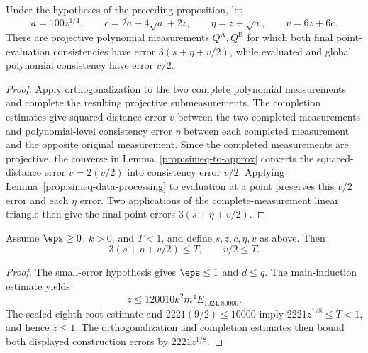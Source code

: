 \begin{proposition}
\label{prop:main-formal-linear-triangle-projective-construction}
	\leanok
	Under the hypotheses of the preceding proposition, let
	\[
		a=100z^{1/4},
		\qquad c=2a+4\sqrt a+2z,
		\qquad \eta=z+\sqrt a,
		\qquad v=6z+6c.
	\]
	There are projective polynomial measurements $Q^{\mathrm A},Q^{\mathrm B}$
	for which both final point-evaluation consistencies have error
	$3(s+\eta+v/2)$, while evaluated and global polynomial consistency have
	error $v/2$.
\end{proposition}
\begin{proof}
	\leanok
	Apply orthogonalization to the two complete polynomial measurements and
	complete the resulting projective submeasurements.  The completion estimates
	give squared-distance error $v$ between the two completed measurements and
	polynomial-level consistency error $\eta$ between each completed measurement
	and the opposite original measurement.  Since the completed measurements are
	projective, the converse in Lemma~\ref{prop:simeq-to-approx} converts the
	squared-distance error $v=2(v/2)$ into consistency error $v/2$.  Applying
	Lemma~\ref{prop:simeq-data-processing} to evaluation at a point preserves this
	$v/2$ error and each $\eta$ error.  Two applications of the
	complete-measurement linear triangle then give the final point errors
	$3(s+\eta+v/2)$.
\end{proof}

\begin{lemma}
\label{lem:main-formal-linear-triangle-source-error-absorption}
	\leanok
	Assume $\eps\ge0$, $k>0$, and $T<1$, and define $s,z,c,\eta,v$ as above.
	Then
	\[
		3(s+\eta+v/2)\le T,
		\qquad v/2\le T.
	\]
\end{lemma}
\begin{proof}
	\leanok
	The small-error hypothesis gives $\eps\le1$ and $d\le q$.  The
	main-induction estimate yields
	\[
		z\le120010k^2m^4E_{1024,80000}.
	\]
	The scaled eighth-root estimate and $2221(9/2)\le10000$ imply
	$2221z^{1/8}\le T<1$, and hence $z\le1$.  The orthogonalization and
	completion estimates then bound both displayed construction errors by
	$2221z^{1/8}$.
\end{proof}

